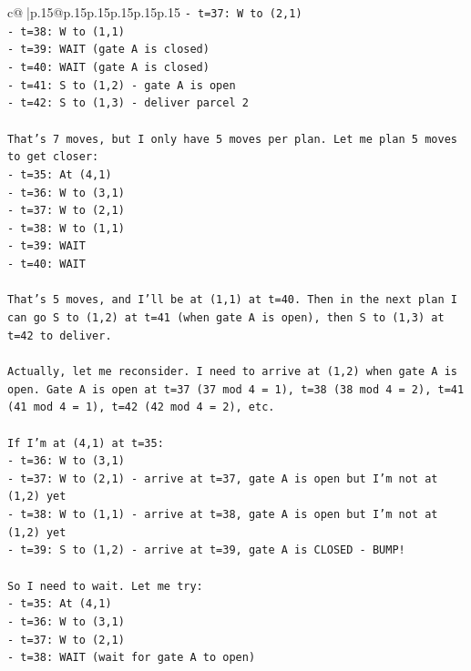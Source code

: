 \documentclass{article}
\begin{document}
{\begin{supertabular}{c@{$\;$}|p{.15\linewidth}@{}p{.15\linewidth}p{.15\linewidth}p{.15\linewidth}p{.15\linewidth}p{.15\linewidth}}
{{{\texttt{{-} t=37: W to (2,1)} \\
\texttt{{-} t=38: W to (1,1)} \\
\texttt{{-} t=39: WAIT (gate A is closed)} \\
\texttt{{-} t=40: WAIT (gate A is closed)} \\
\texttt{{-} t=41: S to (1,2) {-} gate A is open} \\
\texttt{{-} t=42: S to (1,3) {-} deliver parcel 2} \\
\\ 
\texttt{That's 7 moves, but I only have 5 moves per plan. Let me plan 5 moves to get closer:} \\
\texttt{{-} t=35: At (4,1)} \\
\texttt{{-} t=36: W to (3,1)} \\
\texttt{{-} t=37: W to (2,1)} \\
\texttt{{-} t=38: W to (1,1)} \\
\texttt{{-} t=39: WAIT} \\
\texttt{{-} t=40: WAIT} \\
\\ 
\texttt{That's 5 moves, and I'll be at (1,1) at t=40. Then in the next plan I can go S to (1,2) at t=41 (when gate A is open), then S to (1,3) at t=42 to deliver.} \\
\\ 
\texttt{Actually, let me reconsider. I need to arrive at (1,2) when gate A is open. Gate A is open at t=37 (37 mod 4 = 1), t=38 (38 mod 4 = 2), t=41 (41 mod 4 = 1), t=42 (42 mod 4 = 2), etc.} \\
\\ 
\texttt{If I'm at (4,1) at t=35:} \\
\texttt{{-} t=36: W to (3,1)} \\
\texttt{{-} t=37: W to (2,1) {-} arrive at t=37, gate A is open but I'm not at (1,2) yet} \\
\texttt{{-} t=38: W to (1,1) {-} arrive at t=38, gate A is open but I'm not at (1,2) yet} \\
\texttt{{-} t=39: S to (1,2) {-} arrive at t=39, gate A is CLOSED {-} BUMP!} \\
\\ 
\texttt{So I need to wait. Let me try:} \\
\texttt{{-} t=35: At (4,1)} \\
\texttt{{-} t=36: W to (3,1)} \\
\texttt{{-} t=37: W to (2,1)} \\
\texttt{{-} t=38: WAIT (wait for gate A to open)} \\
}}}
\end{supertabular}}
\end{document}
